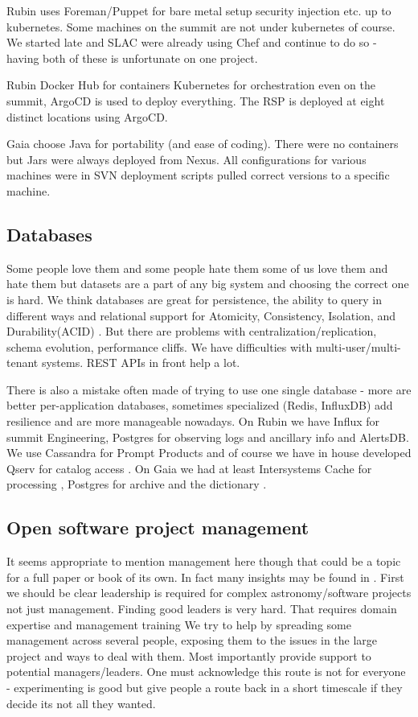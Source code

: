 \documentclass[11pt,twoside]{article}
\begin{document}
Rubin uses Foreman/Puppet for bare metal setup security injection etc. up to kubernetes. Some machines on the summit are not under kubernetes of course.
We started late and SLAC were already using Chef and continue to do so - having both of these is unfortunate on one project.

Rubin Docker Hub for containers Kubernetes  for orchestration even  on the summit, ArgoCD is used to deploy everything. The RSP is deployed at eight distinct locations using ArgoCD.


Gaia choose Java for portability  (and ease of coding).
There were no containers but Jars were always deployed from Nexus.
All configurations for various machines were in SVN  deployment scripts pulled correct versions to a specific machine.

\subsection{Databases}
Some people love them and some people hate them some of us love them and hate them but datasets are a part of any big system and choosing the correct one is hard.
We think databases are great for persistence, the ability to query in different ways and relational support for Atomicity, Consistency, Isolation, and Durability(ACID) .
But there are problems with centralization/replication, schema evolution, performance cliffs.
We have  difficulties with multi-user/multi-tenant systems.
REST APIs in front help a lot.

There is also a mistake often made of trying to use one single database -
more are better per-application databases, sometimes specialized (Redis, InfluxDB) add resilience and are more manageable nowadays.
On Rubin we have Influx for summit Engineering, Postgres for observing logs and ancillary info and AlertsDB.
We use Cassandra for Prompt Products and of course we have in house developed Qserv for catalog access \citep{C15_adassxxxii}.
On Gaia we had at least Intersystems Cache for processing \cite{2011ExA....31..215O}, Postgres for archive and the dictionary .

\subsection{Open software project management}
It seems appropriate to mention management here though that could be a topic for a full paper or book of its own.
In fact many insights may be found in \citet{OMULLANE2005}.
First we should be clear leadership is required for complex astronomy/software projects not just management.
Finding good leaders is very hard.
That requires domain expertise and management training
We try to help by spreading some management across several people, exposing them to the issues in the large project and ways to deal with them.
Most importantly provide support to potential managers/leaders.
One must  acknowledge this route is not for everyone  - experimenting is good but give people a route back in a short timescale if they decide its not all they wanted.
\end{document}
